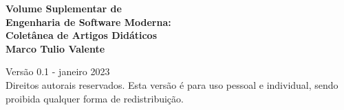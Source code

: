\thispagestyle{empty}

\newpage
\thispagestyle{empty}
\vspace*{3cm}
\begin{center}
{\Huge \bf Volume Suplementar de }\\
\vspace*{0.8cm}
{\Huge \bf Engenharia de Software Moderna:}\\ 
\vspace*{0.8cm}
{\Huge \bf Coletânea de Artigos Didáticos}\\ 
\vspace*{3cm}
{\Large \bf Marco Tulio Valente}
\end{center}
\newpage

\thispagestyle{empty}
\vspace*{3cm}
\begin{center}
{\Large  Versão 0.1 - janeiro 2023}\\ 
\vspace*{1cm}
{Direitos autorais reservados. Esta versão é para uso pessoal e individual, sendo proibida qualquer forma de redistribuição.}
\end{center}
\newpage

\tableofcontents
